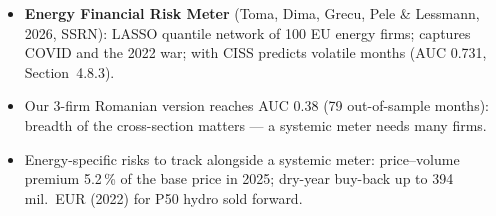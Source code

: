 \begin{itemize}\setlength{\itemsep}{2pt}
  \item \textbf{Energy Financial Risk Meter} (Toma, Dima, Grecu, Pele \& Lessmann, 2026, SSRN): LASSO quantile network of 100 EU energy firms; captures COVID and the 2022 war; with CISS predicts volatile months (AUC 0.731, Section~4.8.3).
  \item Our 3-firm Romanian version reaches AUC 0.38 (79 out-of-sample months): breadth of the cross-section matters --- a systemic meter needs many firms.
  \item Energy-specific risks to track alongside a systemic meter: price--volume premium 5.2\,\% of the base price in 2025; dry-year buy-back up to 394 mil.\ EUR (2022) for P50 hydro sold forward.
\end{itemize}
